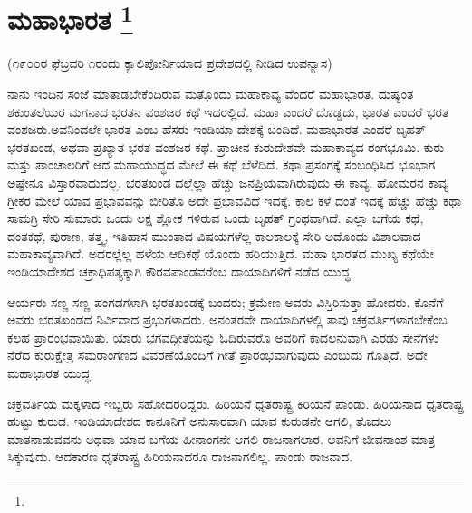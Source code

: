 
\chapter[ಮಹಾಭಾರತ ]{ಮಹಾಭಾರತ \protect\footnote{}}

\centerline{(೧೯೦೦ರ ಫೆಬ್ರವರಿ ೧ರಂದು ಕ್ಯಾಲಿಪೋರ್ನಿಯಾದ ಪ್ರದೇಶದಲ್ಲಿ ನೀಡಿದ ಉಪನ್ಯಾಸ)}

ನಾನು ಇಂದಿನ ಸಂಜೆ ಮಾತಾಡಬೇಕೆಂದಿರುವ ಮತ್ತೊಂದು ಮಹಾಕಾವ್ಯ ವೆಂದರೆ ಮಹಾಭಾರತ. ದುಷ್ಯಂತ ಶಕುಂತಲೆಯರ ಮಗನಾದ ಭರತನ ವಂಶಜರ ಕಥೆ ಇದರಲ್ಲಿದೆ. ಮಹಾ ಎಂದರೆ ದೊಡ್ಡದು, ಭಾರತ ಎಂದರೆ ಭರತ ವಂಶಜರು.ಅವನಿಂದಲೇ ಭಾರತ ಎಂಬ ಹೆಸರು ಇಂಡಿಯಾ ದೇಶಕ್ಕೆ ಬಂದಿದೆ. ಮಹಾಭಾರತ ಎಂದರೆ ಬೃಹತ್​ ಭರತಖಂಡ, ಅಥವಾ ಪ್ರಖ್ಯಾತ ಭರತ ವಂಶಜರ ಕಥೆ. ಪ್ರಾಚೀನ ಕುರುದೇಶವೇ ಮಹಾಕಾವ್ಯದ ರಂಗಭೂಮಿ. ಕುರು ಮತ್ತು ಪಾಂಚಾಲರಿಗೆ ಆದ ಮಹಾಯುದ್ಧದ ಮೇಲೆ ಈ ಕಥೆ ಬೆಳೆದಿದೆ. ಕಥಾ ಪ್ರಸಂಗಕ್ಕೆ ಸಂಬಂಧಿಸಿದ ಭೂಭಾಗ ಅಷ್ಟೇನೂ ವಿಸ್ತಾರವಾದುದಲ್ಲ. ಭರತಖಂಡ ದಲ್ಲೆಲ್ಲಾ ಹೆಚ್ಚು ಜನಪ್ರಿಯವಾಗಿರುವುದು ಈ ಕಾವ್ಯ. ಹೋಮರನ ಕಾವ್ಯ ಗ್ರೀಕರ ಮೇಲೆ ಯಾವ ಪ್ರಭಾವವನ್ನು ಬೀರಿತೊ ಅದೇ ಪ್ರಭಾವವಿದೆ ಇದಕ್ಕೆ. ಕಾಲ ಕಳೆ ದಂತೆ ಇದಕ್ಕೆ ಹೆಚ್ಚು ಹೆಚ್ಚು ಕಥಾ ಸಾಮಗ್ರಿ ಸೇರಿ ಸುಮಾರು ಒಂದು ಲಕ್ಷ ಶ್ಲೋಕ ಗಳಿರುವ ಒಂದು ಬೃಹತ್​ ಗ್ರಂಥವಾಗಿದೆ. ಎಲ್ಲಾ ಬಗೆಯ ಕಥೆ, ದಂತಕಥೆ, ಪುರಾಣ, ತತ್ತ್ವ, ಇತಿಹಾಸ ಮುಂತಾದ ವಿಷಯಗಳೆಲ್ಲ ಕಾಲಕಾಲಕ್ಕೆ ಸೇರಿ ಅದೊಂದು ವಿಶಾಲವಾದ ಮಹಾಕಾವ್ಯವಾಗಿದೆ. ಅದರಲ್ಲೆಲ್ಲ ಹಳೆಯ ಆದಿಕಥೆ ಯೊಂದು ಹರಿಯುತ್ತಿದೆ. ಮಹಾ ಭಾರತದ ಮುಖ್ಯ ಕಥೆಯೇ ಇಂಡಿಯಾದೇಶದ ಚಕ್ರಾಧಿಪತ್ಯಕ್ಕಾಗಿ ಕೌರವಪಾಂಡವರೆಂಬ ದಾಯಾದಿಗಳಿಗೆ ನಡೆದ ಯುದ್ಧ.

ಆರ್ಯರು ಸಣ್ಣ ಸಣ್ಣ ಪಂಗಡಗಳಾಗಿ ಭರತಖಂಡಕ್ಕೆ ಬಂದರು; ಕ್ರಮೇಣ ಅವರು ವಿಸ್ತಿರಿಸುತ್ತಾ ಹೋದರು. ಕೊನೆಗೆ ಅವರು ಭರತಖಂಡದ ನಿರ್ವಿವಾದ ಪ್ರಭುಗಳಾದರು. ಅನಂತರವೇ ದಾಯಾದಿಗಳಲ್ಲಿ ತಾವು ಚಕ್ರವರ್ತಿಗಳಾಗಬೇಕೆಂಬ ಕಲಹ ಪ್ರಾರಂಭವಾಯಿತು. ಯಾರು ಭಗವದ್ಗೀತೆಯನ್ನು ಓದಿರುವರೊ ಅವರಿಗೆ ಕಾದಲನುವಾಗಿ ಎರಡು ಸೇನೆಗಳು ನೆರೆದ ಕುರುಕ್ಷೇತ್ರ ಸಮರಾಂಗಣದ ವಿವರಣೆಯೊಂದಿಗೆ ಗೀತೆ ಪ್ರಾರಂಭವಾಗುವುದು ಎಂಬುದು ಗೊತ್ತಿದೆ. ಅದೇ ಮಹಾಭಾರತ ಯುದ್ಧ.

ಚಕ್ರವರ್ತಿಯ ಮಕ್ಕಳಾದ ಇಬ್ಬರು ಸಹೋದರರಿದ್ದರು. ಹಿರಿಯನೆ ಧೃತರಾಷ್ಟ್ರ ಕಿರಿಯನೆ ಪಾಂಡು. ಹಿರಿಯನಾದ ಧೃತರಾಷ್ಟ್ರ ಹುಟ್ಟು ಕುರುಡ. ಇಂಡಿಯಾದೇಶದ ಕಾನೂನಿಗೆ ಅನುಸಾರವಾಗಿ ಯಾವ ಕುರುಡನೇ ಆಗಲಿ, ತೊದಲು ಮಾತನಾಡುವವನು ಅಥವಾ ಯಾವ ಬಗೆಯ ಹೀನಾಂಗನೇ ಆಗಲಿ ರಾಜನಾಗಲಾರ. ಅವನಿಗೆ ಜೀವನಾಂಶ ಮಾತ್ರ ಸಿಕ್ಕುವುದು. ಆದಕಾರಣ ಧೃತರಾಷ್ಟ್ರ ಹಿರಿಯನಾದರೂ ರಾಜನಾಗಲಿಲ್ಲ. ಪಾಂಡು ರಾಜನಾದ.

